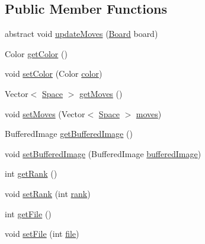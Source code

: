 \subsection*{Public Member Functions}
\begin{DoxyCompactItemize}
\item 
abstract void \hyperlink{classpiece_1_1Piece_a4dbb3f3506bfc5c4a2015182857d08e0}{update\-Moves} (\hyperlink{classmodel_1_1Board}{Board} board)
\item 
Color \hyperlink{classpiece_1_1Piece_ad4c523c97739f39df0c74059b40b24c3}{get\-Color} ()
\item 
void \hyperlink{classpiece_1_1Piece_ad1b0ab8b18993689c7bd45a9b8603bd4}{set\-Color} (Color \hyperlink{classpiece_1_1Piece_a3b9829de5683f4c966f4a6c98ad77d65}{color})
\item 
Vector$<$ \hyperlink{classmodel_1_1Space}{Space} $>$ \hyperlink{classpiece_1_1Piece_ab0a26f70a1ce3629baa8e5b13e176c9d}{get\-Moves} ()
\item 
void \hyperlink{classpiece_1_1Piece_ac9cf15e923e68e74f7a04c8108a86dab}{set\-Moves} (Vector$<$ \hyperlink{classmodel_1_1Space}{Space} $>$ \hyperlink{classpiece_1_1Piece_ab29bfb629292cb4ae39a5dd545a31aaf}{moves})
\item 
Buffered\-Image \hyperlink{classpiece_1_1Piece_afdff33667aeac45d1d9488eaeeb33cd2}{get\-Buffered\-Image} ()
\item 
void \hyperlink{classpiece_1_1Piece_a9a970552f400d8e70f2352a00a865494}{set\-Buffered\-Image} (Buffered\-Image \hyperlink{classpiece_1_1Piece_a287a5ae3797417dbc7a04def1bb8ceda}{buffered\-Image})
\item 
int \hyperlink{classpiece_1_1Piece_aa35551eff88a4a92287081afd6b16cf1}{get\-Rank} ()
\item 
void \hyperlink{classpiece_1_1Piece_a606e9a98be26e1ee783241b544c765e8}{set\-Rank} (int \hyperlink{classpiece_1_1Piece_ac015e60596ce57e3f96328fc61f66b95}{rank})
\item 
int \hyperlink{classpiece_1_1Piece_ab5386372600efab6ad744403be8ef1ad}{get\-File} ()
\item 
void \hyperlink{classpiece_1_1Piece_ad9561eda23e5bb0c595ad5db112c9d8a}{set\-File} (int \hyperlink{classpiece_1_1Piece_af30351ae20932383ee93fdd2e73f65ec}{file})
\end{DoxyCompactItemize}
